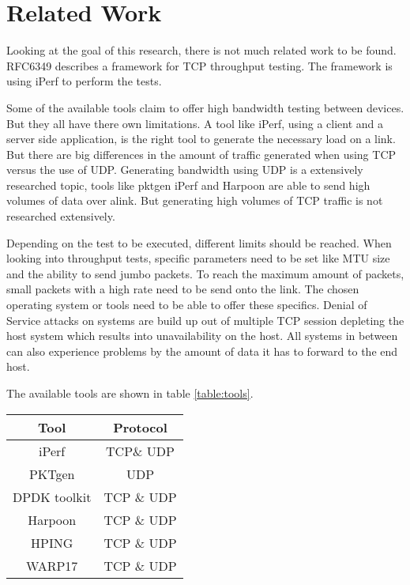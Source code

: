 \section{Related Work}

Looking at the goal of this research, there is not much related work to be found.
RFC6349 \cite{RFC6349} describes a framework for TCP throughput testing. The framework is using iPerf to perform the tests.     

Some of the available tools claim to offer high bandwidth testing between devices. But they all have there own limitations. 
A tool like iPerf, using a client and a server side application, is the right tool to generate the necessary load on a link. But there are big differences in the amount of traffic generated when using TCP versus the use of UDP.
Generating bandwidth using UDP is a extensively researched topic, tools like pktgen \cite{pktgen} iPerf \cite{iperf} and Harpoon \cite{harpoon} are able to send high volumes of data over alink. But generating high volumes of TCP traffic is not researched extensively.  

Depending on the test to be executed, different limits should be reached. 
When looking into throughput tests, specific parameters need to be set like MTU size and the ability to send jumbo packets.
To reach the maximum amount of packets, small packets with a high rate need to be send onto the link. The chosen operating system or tools need to be able to offer these specifics.
Denial of Service attacks on systems are build up out of multiple TCP session depleting the host system which results into unavailability on the host. All systems in between can also experience problems by the amount of data it has to forward to the end host.

The available tools are shown in table \ref{table:tools}.

\begin{table*}[ht]
\centering
\begin{tabular}{|c|c|} \hline
\textbf{Tool} & \textbf{Protocol} \\ \hline
iPerf & TCP\& UDP \\ \hline
PKTgen & UDP \\ \hline
DPDK toolkit & TCP \& UDP \\ \hline
Harpoon & TCP \& UDP \\ \hline
HPING  & TCP \& UDP\\ \hline
WARP17 & TCP \& UDP \\ \hline
\end{tabular}
\caption{available tools}
\label{table:tools}
\end{table*}

